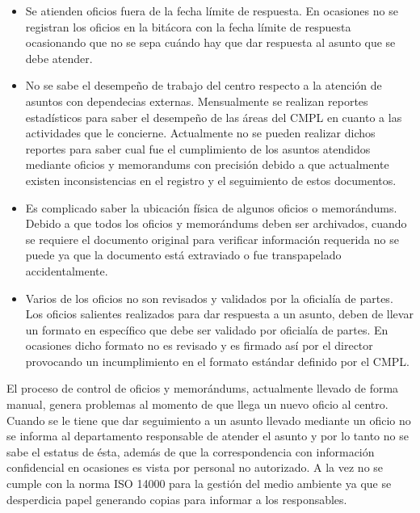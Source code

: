 \begin{itemize}
	\item Se atienden oficios fuera de la fecha límite de respuesta.
En ocasiones no se registran los oficios en la bitácora con la fecha límite de respuesta ocasionando que no se sepa cuándo hay que dar respuesta al asunto que se debe atender.	
	
	\item No se sabe el desempeño de trabajo del centro respecto a la atención de asuntos con dependecias externas.
Mensualmente se realizan reportes estadísticos para saber el desempeño de las áreas del CMPL en cuanto a las actividades que le concierne. Actualmente no se pueden realizar dichos reportes para saber cual fue el cumplimiento de los asuntos atendidos mediante oficios y memorandums con precisión debido a que actualmente existen inconsistencias en el registro y el seguimiento de estos documentos.
	
	\item Es complicado saber la ubicación física de algunos oficios o memorándums. %
Debido a que todos los oficios y memorándums deben ser archivados, cuando se requiere el documento original para verificar información requerida no se puede ya que la documento está extraviado o fue transpapelado accidentalmente.
	
	\item Varios de los oficios no son revisados y validados por la oficialía de partes.
Los oficios salientes realizados para dar respuesta a un asunto, deben de llevar un formato en específico que debe ser validado por oficialía de partes. En ocasiones dicho formato no es revisado y es firmado así por el director provocando un incumplimiento en el formato estándar definido por el CMPL.	
	\end{itemize}
	
El proceso de control de oficios y memorándums, actualmente llevado de forma manual, genera problemas al momento de que llega un nuevo oficio al centro. Cuando se le tiene que dar seguimiento a un asunto llevado mediante un oficio no se informa al departamento responsable de atender el asunto y por lo tanto no se sabe el estatus de ésta, además de que la correspondencia con información confidencial en ocasiones es vista por personal no autorizado. A la vez no se cumple con la norma ISO 14000 para la gestión del medio ambiente ya que se desperdicia papel generando copias para informar a los responsables.

